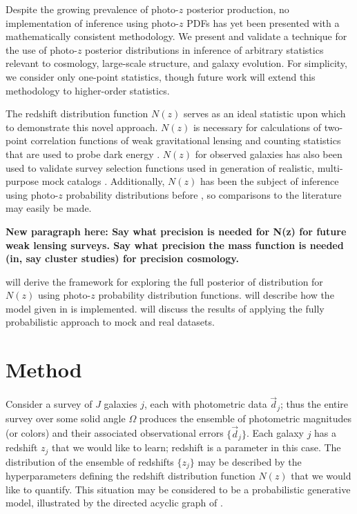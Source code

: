 Despite the growing prevalence of photo-$z$ posterior production, no implementation of inference using photo-$z$ PDFs has yet been presented with a mathematically consistent methodology.  
We present and validate a technique for the use of photo-$z$ posterior distributions in inference of arbitrary statistics relevant to cosmology, large-scale structure, and galaxy evolution.  
For simplicity, we consider only one-point statistics, though future work will extend this methodology to higher-order statistics.

The redshift distribution function $N(z)$ serves as an ideal statistic upon which to demonstrate this novel approach.  
$N(z)$ is necessary for calculations of two-point correlation functions of weak gravitational lensing and counting statistics that are used to probe dark energy \citep{Masters2015}.  
$N(z)$ for observed galaxies has also been used to validate survey selection functions used in generation of realistic, multi-purpose mock catalogs \citep{Norberg2002}.  
Additionally, $N(z)$ has been the subject of inference using photo-$z$ probability distributions before \citep{Sheldon2012, Hildebrandt2012, Kelly2014, Benjamin2013, Bonnett2015a, Viironen2015, Asorey2016, Leistedt2016}, so comparisons to the literature may easily be made. 

\textbf{New paragraph here: Say what precision is needed for N(z) for future weak lensing surveys. Say what precision the mass function is needed (in, say cluster studies) for precision cosmology.}

 will derive the framework for exploring the full posterior of distribution for $N(z)$ using photo-$z$ probability distribution functions.  
 will describe how the model given in  is implemented.  
 will discuss the results of applying the fully probabilistic approach to mock and real datasets.

\section{Method}

Consider a survey of $J$ galaxies $j$, each with photometric data $\vec{d}_{j}$; thus the entire survey over some solid angle $\Omega$ produces the ensemble of photometric magnitudes (or colors) and their associated observational errors $\{\vec{d}_{j}\}$.  
Each galaxy $j$ has a redshift $z_{j}$ that we would like to learn; redshift is a parameter in this case.  
The distribution of the ensemble of redshifts $\{z_{j}\}$ may be described by the hyperparameters defining the redshift distribution function $N(z)$ that we would like to quantify.  
This situation may be considered to be a probabilistic generative model, illustrated by the directed acyclic graph of .  

